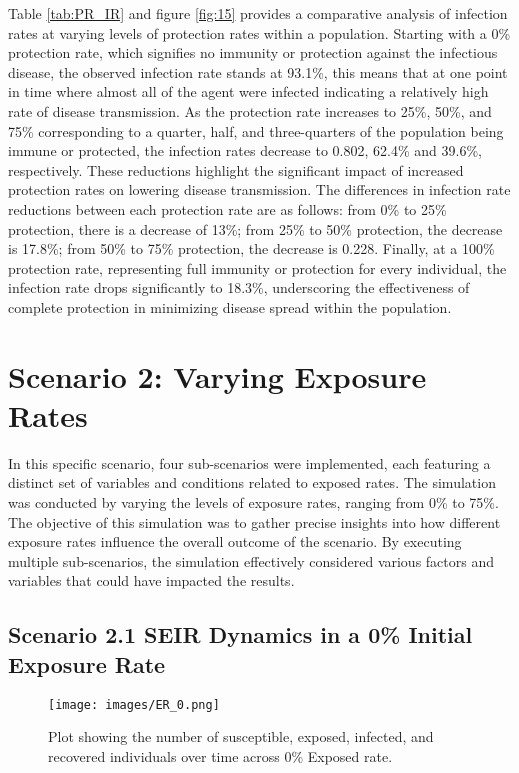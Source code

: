 Table \ref{tab:PR_IR} and figure \ref{fig:15} provides a comparative analysis of infection rates at varying levels of protection rates within a population. Starting with a 0\% protection rate, which signifies no immunity or protection against the infectious disease, the observed infection rate stands at 93.1\%, this means that at one point in time where almost all of the agent were infected indicating a relatively high rate of disease transmission. As the protection rate increases to 25\%, 50\%, and 75\% corresponding to a quarter, half, and three-quarters of the population being immune or protected, the infection rates decrease to  0.802, 62.4\% and 39.6\%, respectively. These reductions highlight the significant impact of increased protection rates on lowering disease transmission. The differences in infection rate reductions between each protection rate are as follows: from 0\% to 25\% protection, there is a decrease of 13\%; from 25\% to 50\% protection, the decrease is 17.8\%; from 50\% to 75\% protection, the decrease is 0.228. Finally, at a 100\% protection rate, representing full immunity or protection for every individual, the infection rate drops significantly to 18.3\%, underscoring the effectiveness of complete protection in minimizing disease spread within the population. 



\section{ Scenario 2: Varying Exposure Rates}
\label{S2}
In this specific scenario, four sub-scenarios were implemented, each featuring a distinct set of variables and conditions related to exposed rates. The simulation was conducted by varying the levels of exposure rates, ranging from 0\% to 75\%. The objective of this simulation was to gather precise insights into how different exposure rates influence the overall outcome of the scenario. By executing multiple sub-scenarios, the simulation effectively considered various factors and variables that could have impacted the results.

\subsection{ Scenario 2.1 SEIR Dynamics in a 0\% Initial Exposure Rate}
\begin{figure}[H]
	\centering
	\texttt{[image: images/ER\_0.png]}
	\caption{Plot showing the number of susceptible, exposed, infected, and recovered individuals over time across 0\% Exposed rate. }
	\label{fig:13}
\end{figure}

